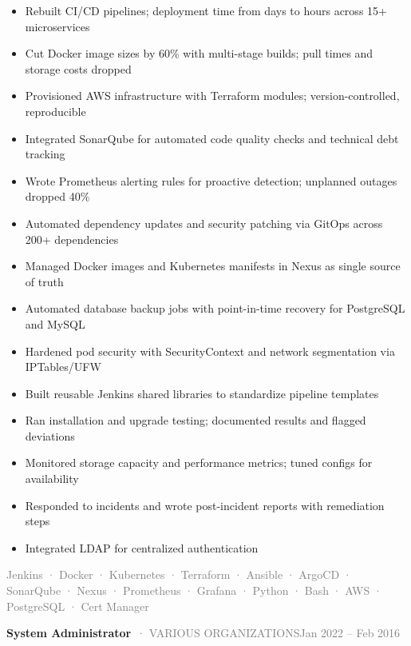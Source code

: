 \documentclass[10pt,a4paper]{article}
\newcommand{\cventry}[3]{\textbf{#1}\ \textcolor{graytext}{· #2}\hfill\textcolor{graytext}{\small #3}\par}
\newcommand{\tagline}[1]{\textcolor{graytext}{\small #1}\par}
\begin{document}
\begin{itemize}
  \item Rebuilt CI/CD pipelines; deployment time from days to hours across 15+ microservices
  \item Cut Docker image sizes by 60\% with multi-stage builds; pull times and storage costs dropped
  \item Provisioned AWS infrastructure with Terraform modules; version-controlled, reproducible
  \item Integrated SonarQube for automated code quality checks and technical debt tracking
  \item Wrote Prometheus alerting rules for proactive detection; unplanned outages dropped 40\%
  \item Automated dependency updates and security patching via GitOps across 200+ dependencies
  \item Managed Docker images and Kubernetes manifests in Nexus as single source of truth
  \item Automated database backup jobs with point-in-time recovery for PostgreSQL and MySQL
  \item Hardened pod security with SecurityContext and network segmentation via IPTables/UFW
  \item Built reusable Jenkins shared libraries to standardize pipeline templates
  \item Ran installation and upgrade testing; documented results and flagged deviations
  \item Monitored storage capacity and performance metrics; tuned configs for availability
  \item Responded to incidents and wrote post-incident reports with remediation steps
  \item Integrated LDAP for centralized authentication
\end{itemize}
\tagline{Jenkins · Docker · Kubernetes · Terraform · Ansible · ArgoCD · SonarQube · Nexus · Prometheus · Grafana · Python · Bash · AWS · PostgreSQL · Cert Manager}
\vspace{1pt}
\vspace{3pt}
\cventry{System Administrator}{VARIOUS ORGANIZATIONS}{Jan 2022 – Feb 2016}
\end{document}
